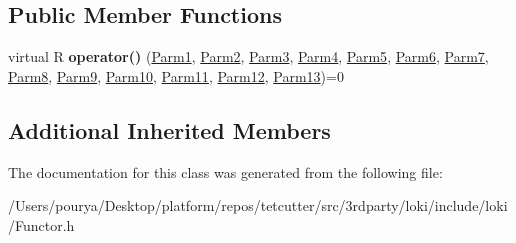 \subsection*{Public Member Functions}
\begin{DoxyCompactItemize}
\item 
\hypertarget{classLoki_1_1FunctorImpl_3_01R_00_01_01_01_01_01_01_01_01_01_01_01_01_01_01_01_01_01_01_01_01_014965e6be24aaa77e42ff93e5d285477f_aa4d84210aa414b6f4981f79ba5883c5a}{}virtual R {\bfseries operator()} (\hyperlink{classLoki_1_1EmptyType}{Parm1}, \hyperlink{classLoki_1_1EmptyType}{Parm2}, \hyperlink{classLoki_1_1EmptyType}{Parm3}, \hyperlink{classLoki_1_1EmptyType}{Parm4}, \hyperlink{classLoki_1_1EmptyType}{Parm5}, \hyperlink{classLoki_1_1EmptyType}{Parm6}, \hyperlink{classLoki_1_1EmptyType}{Parm7}, \hyperlink{classLoki_1_1EmptyType}{Parm8}, \hyperlink{classLoki_1_1EmptyType}{Parm9}, \hyperlink{classLoki_1_1EmptyType}{Parm10}, \hyperlink{classLoki_1_1EmptyType}{Parm11}, \hyperlink{classLoki_1_1EmptyType}{Parm12}, \hyperlink{classLoki_1_1EmptyType}{Parm13})=0\label{classLoki_1_1FunctorImpl_3_01R_00_01_01_01_01_01_01_01_01_01_01_01_01_01_01_01_01_01_01_01_01_014965e6be24aaa77e42ff93e5d285477f_aa4d84210aa414b6f4981f79ba5883c5a}

\end{DoxyCompactItemize}
\subsection*{Additional Inherited Members}


The documentation for this class was generated from the following file\+:\begin{DoxyCompactItemize}
\item 
/\+Users/pourya/\+Desktop/platform/repos/tetcutter/src/3rdparty/loki/include/loki/Functor.\+h\end{DoxyCompactItemize}
